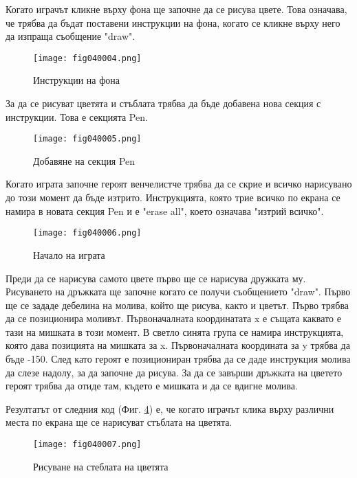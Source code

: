Когато играчът кликне върху фона ще започне да се рисува цвете. Това означава, че трябва да бъдат поставени инструкции на фона, когато се кликне върху него да изпраща съобщение "draw".

\begin{figure}[H]
  \centering
  \texttt{[image: fig040004.png]}
  \caption{Инструкции на фона}
\label{fig040004}
\end{figure}

За да се рисуват цветята и стъблата трябва да бъде добавена нова секция с инструкции. Това е секцията Pen.

\begin{figure}[H]
  \centering
  \texttt{[image: fig040005.png]}
  \caption{Добавяне на секция Pen}
\label{fig040005}
\end{figure}

Когато играта започне героят венчелистче трябва да се скрие и всичко нарисувано до този момент да бъде изтрито. Инструкцията, която трие всичко по екрана се намира в новата секция Pen и е "erase all", което означава "изтрий всичко".

\begin{figure}[H]
  \centering
  \texttt{[image: fig040006.png]}
  \caption{Начало на играта}
\label{fig040006}
\end{figure}

Преди да се нарисува самото цвете първо ще се нарисува дружката му. Рисуването на дръжката ще започне когато се получи съобщението "draw". Първо ще се зададе дебелина на молива, който ще рисува, както и цветът. Първо трябва да се позиционира моливът. Първоначалната координатата x е същата каквато е тази на мишката в този момент. В светло синята група се намира инструкцията, която дава позицията на мишката за x. Първоначалната координата за y трябва да бъде -150. След като героят е позициониран трябва да се даде инструкция молива да слезе надолу, за да започне да рисува. За да се завърши дръжката на цветето героят трябва да отиде там, където е мишката и да се вдигне молива.

Резултатът от следния код (Фиг. \ref{fig040007}) е, че когато играчът клика върху различни места по екрана ще се нарисуват стъблата на цветята.

\begin{figure}[H]
  \centering
  \texttt{[image: fig040007.png]}
  \caption{Рисуване на стеблата на цветята}
\label{fig040007}
\end{figure}

